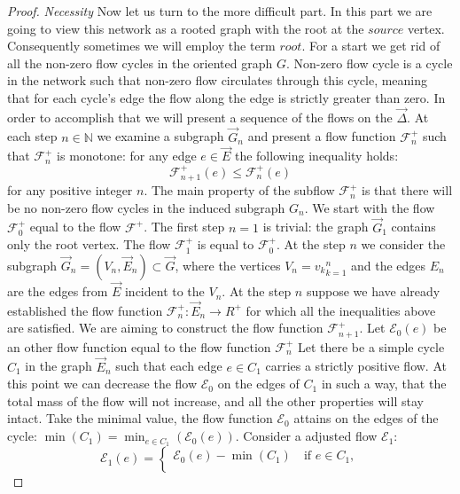 \documentclass[12pt]{article}
\renewcommand{\cal}[1]{\mathcal{#1}}
\renewcommand{\leq}{\leqslant}
\theoremstyle{definition}
\newcommand{\flowpos}{\mathcal{F}^{+}}
\newcommand{\flowposn}[1]{\mathcal{F}_{#1}^{+}}
\newcommand{\source}{\mathit{source}}
\renewcommand{\root}{\mathit{root}}
\newcommand{\onet}{\vec{\Delta}}
\numberwithin{remark}{section}
\numberwithin{theorem}{section}
\numberwithin{prop}{section}
\numberwithin{equation}{section}
\numberwithin{lemma}{section}
\numberwithin{prop_under_lemma}{lemma}
\begin{document}
\begin{proof}
      \noindent\textit{Necessity}
      Now let us turn to the more difficult part.
      In this part we are going to view this network as a rooted graph with the root at the $\source$ vertex.
      Consequently sometimes we will employ the term $\root$.
      For a start we get rid of all the non-zero flow cycles in the oriented graph $G$.
      Non-zero flow cycle is a cycle in the network such that non-zero flow circulates through this cycle,
      meaning that for each cycle's edge the flow along the edge is strictly greater than zero.
      In order to accomplish that we will present a sequence of the flows on the $\onet$.
      At each step $n \in \mathbb{N}$ we examine a subgraph $\vec{G}_n$ and present a flow function $\flowposn{n}$
        such that $\flowposn{n}$ is monotone: for any edge $e \in \vec{E}$ the following inequality holds:
      \[
        \flowposn{n+1}(e) \leq \flowposn{n}(e)
      \]
      for any positive integer $n$.
      The main property of the subflow $\flowposn{n}$ is that there will be no non-zero flow cycles in the induced subgraph
      $G_n$.
      We start with the flow $\flowposn{0}$ equal to the flow $\flowpos$.
      The first step $n = 1$ is trivial: the graph $\vec{G}_1$ contains only the root vertex.
      The flow $\flowposn{1}$ is equal to $\flowposn{0}$.
      At the step $n$ we consider the subgraph $\vec{G}_n = (V_n, \vec{E}_n) \subset \vec{G}$, where the vertices
        $V_n = {v_k}_{k=1}^n$ and the edges $E_n$ are the edges from $\vec{E}$ incident to the $V_n$.
      At the step $n$ suppose we have already established the flow function $\flowposn{n}: \vec{E}_{n} \to R^{+}$ for which
        all the inequalities above are satisfied.
      We are aiming to construct the flow function $\flowposn{n+1}$.
      Let $\cal{E}_0(e)$ be an other flow function  equal to the flow function $\flowposn{n}$
      Let there be a simple cycle $C_1$ in the graph $\vec{E}_n$ such that each edge $e \in C_1$ carries
        a strictly positive flow.
      At this point we can decrease the flow $\cal{E}_0$ on the edges of $C_1$ in such a way, that the total mass
        of the flow will not increase, and all the other properties will stay intact.
      Take the minimal value, the flow function $\cal{E}_0$
        attains on the edges of the cycle: $\displaystyle\min(C_1) = \min_{e \in C_1}\left(\cal{E}_0(e)\right)$.
      Consider a adjusted flow $\cal{E}_1$:
      \begin{equation*}
        \cal{E}_1(e) =
        \begin{cases}
          \cal{E}_0(e) - \min(C_1) \quad \text{if } e \in C_1,\\

\end{cases}
\end{equation*}
\end{proof}
\end{document}
